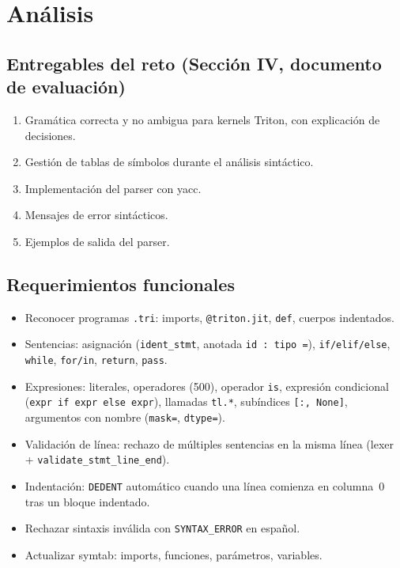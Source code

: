 \section{Análisis}

\subsection{Entregables del reto (Sección IV, documento de evaluación)}
\begin{enumerate}
  \item Gramática correcta y no ambigua para kernels Triton, con explicación de decisiones.
  \item Gestión de tablas de símbolos durante el análisis sintáctico.
  \item Implementación del parser con yacc.
  \item Mensajes de error sintácticos.
  \item Ejemplos de salida del parser.
\end{enumerate}

\subsection{Requerimientos funcionales}
\begin{itemize}
  \item Reconocer programas \texttt{.tri}: imports, \texttt{@triton.jit}, \texttt{def}, cuerpos indentados.
  \item Sentencias: asignación (\texttt{ident\_stmt}, anotada \texttt{id : tipo =}), \texttt{if/elif/else}, \texttt{while}, \texttt{for/in}, \texttt{return}, \texttt{pass}.
  \item Expresiones: literales, operadores (500), operador \texttt{is}, expresión condicional (\texttt{expr if expr else expr}), llamadas \texttt{tl.*}, subíndices \texttt{[:, None]}, argumentos con nombre (\texttt{mask=}, \texttt{dtype=}).
  \item Validación de línea: rechazo de múltiples sentencias en la misma línea (lexer + \texttt{validate\_stmt\_line\_end}).
  \item Indentación: \texttt{DEDENT} automático cuando una línea comienza en columna~0 tras un bloque indentado.
  \item Rechazar sintaxis inválida con \texttt{SYNTAX\_ERROR} en español.
  \item Actualizar symtab: imports, funciones, parámetros, variables.
\end{itemize}

